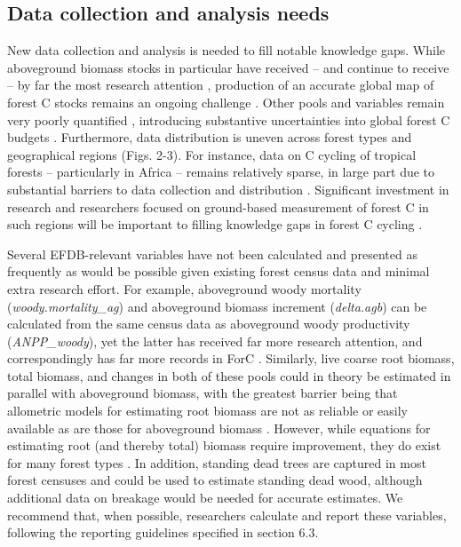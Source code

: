 \documentclass[, manuscript]{copernicus}
\begin{document}
\subsection{Data collection and analysis needs}

New data collection and analysis is needed to fill notable knowledge
gaps. While aboveground biomass stocks in particular have received --
and continue to receive -- by far the most research attention
\citep[Table
2,][]{anderson-teixeira_carbon_2021, dubayah_global_2020, quegan_european_2019, nisar_nasaisro_2018},
production of an accurate global map of forest C stocks remains an
ongoing challenge \citep{araza_decade_2023}. Other pools and variables
remain very poorly quantified \citep[Table
2,][]{anderson-teixeira_carbon_2021}, introducing substantive
uncertainties into global forest C budgets
\citep{pan_large_2011, harris_global_2021}. Furthermore, data
distribution is uneven across forest types and geographical regions
(Figs. 2-3). For instance, data on C cycling of tropical forests --
particularly in Africa -- remains relatively sparse, in large part due
to substantial barriers to data collection and distribution
\citep{delima_making_2022}. Significant investment in research and
researchers focused on ground-based measurement of forest C in such
regions will be important to filling knowledge gaps in forest C cycling
\citep{delima_making_2022, araza_decade_2023, labriere_forest_2023}.

Several EFDB-relevant variables have not been calculated and presented
as frequently as would be possible given existing forest census data and
minimal extra research effort. For example, aboveground woody mortality
(\emph{woody.mortality\_ag}) and aboveground biomass increment
(\emph{delta.agb}) can be calculated from the same census data as
aboveground woody productivity (\emph{ANPP\_woody}), yet the latter has
received far more research attention, and correspondingly has far more
records in ForC \citetext{\citealp[Table
2,][]{anderson-teixeira_carbon_2021}; \citealp[but
see][]{piponiot_distribution_2022}}. Similarly, live coarse root
biomass, total biomass, and changes in both of these pools could in
theory be estimated in parallel with aboveground biomass, with the
greatest barrier being that allometric models for estimating root
biomass are not as reliable or easily available as are those for
aboveground biomass
\citep{chave_improved_2014, rejou-mechain_biomass_2017, gonzalez-akre_allodb_2022}.
However, while equations for estimating root (and thereby total) biomass
require improvement, they do exist for many forest types
\citep[e.g.,][]{brassard_coarse_2011, chojnacky_updated_2014, waring_overlooking_2017, mokany_critical_2006}.
In addition, standing dead trees are captured in most forest censuses
and could be used to estimate standing dead wood, although additional
data on breakage would be needed for accurate estimates. We recommend
that, when possible, researchers calculate and report these variables,
following the reporting guidelines specified in section 6.3.
\end{document}
